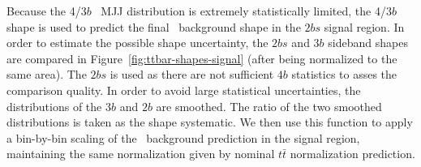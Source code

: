 
Because the 4/$3b$ \ttbar\ MJJ distribution is extremely statistically limited, the 4/$3b$ shape is used to predict the final \ttbar\ background shape in the $2bs$ signal region. In order to estimate the possible shape uncertainty, the $2bs$ and $3b$ sideband shapes are compared in Figure~\ref{fig:ttbar-shapes-signal} (after being normalized to the same area).  The $2bs$ is used as there are not sufficient $4b$ statistics to asses the comparison quality. In order to avoid large statistical uncertainties, the distributions of the $3b$ and $2b$ are smoothed. The ratio of the two smoothed distributions is taken as the shape systematic. We then use this function to apply a bin-by-bin scaling of the \ttbar\ background prediction in the signal region, maintaining the same normalization given by nominal $t\bar{t}$ normalization prediction.


